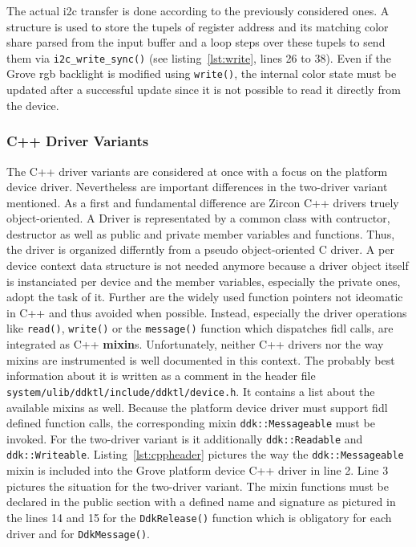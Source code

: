 The actual \ac{i2c} transfer is done according to the previously considered ones.
A structure is used to store the tupels of register address and its matching color share parsed from the input buffer and a loop steps over these tupels to send them via \texttt{i2c_write_sync()} (see listing~\ref{lst:write}, lines 26 to 38).
Even if the Grove \ac{rgb} backlight is modified using \texttt{write()}, the internal color state must be updated after a successful update since it is not possible to read it directly from the device.



\subsubsection*{C++ Driver Variants}
The C++ driver variants are considered at once with a focus on the platform device driver.
Nevertheless are important differences in the two-driver variant mentioned.
As a first and fundamental difference are Zircon C++ drivers truely object-oriented.
A Driver is representated by a common class with contructor, destructor as well as public and private member variables and functions.
Thus, the driver is organized differntly from a pseudo object-oriented C driver.
A per device context data structure is not needed anymore because a driver object itself is instanciated per device and the member variables, especially the private ones, adopt the task of it.  
Further are the widely used function pointers not ideomatic in C++ and thus avoided when possible.
Instead, especially the driver operations like \texttt{read()}, \texttt{write()} or the \texttt{message()} function which dispatches \ac{fidl} calls, are integrated as C++ \textbf{mixin}s.
Unfortunately, neither C++ drivers nor the way mixins are instrumented is well documented in this context.
The probably best information about it is written as a comment in the header file \texttt{system/ulib/ddktl/include/ddktl/device.h}.
It contains a list about the available mixins as well.
Because the platform device driver must support \ac{fidl} defined function calls, the corresponding mixin \texttt{ddk::Messageable} must be invoked.
For the two-driver variant is it additionally \texttt{ddk::Readable} and \texttt{ddk::Writeable}.
Listing~\ref{lst:cppheader} pictures the way the \texttt{ddk::Messageable} mixin is included into the Grove platform device C++ driver in line 2.
Line 3 pictures the situation for the two-driver variant.
The mixin functions must be declared in the public section with a defined name and signature as pictured in the lines 14 and 15 for the \texttt{DdkRelease()} function which is obligatory for each driver and for \texttt{DdkMessage()}.

